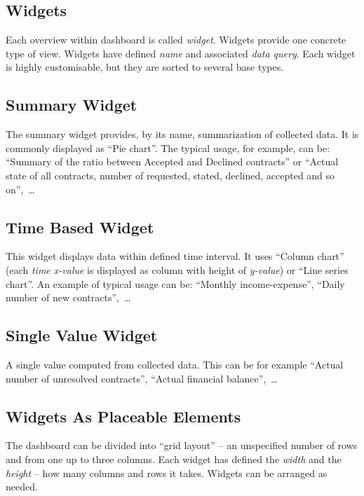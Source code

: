 \subsection{Widgets}
Each overview within dashboard is called \textit{widget}. Widgets provide one concrete type of view. Widgets have defined \textit{name} and associated \textit{data query}. Each widget is highly customisable, but they are sorted to several base types.
\subsection{Summary Widget}
The summary widget provides, by its name, summarization of collected data. It is commonly displayed as ``Pie chart''. The typical usage, for example, can be: ``Summary of the ratio between Accepted and Declined contracts'' or ``Actual state of all contracts, number of requested, stated, declined, accepted and so on'',~\dots
\subsection{Time Based Widget}
This widget displays data within defined time interval. It uses ``Column chart''  (each \textit{time x-value} is displayed as column with height of \textit{y-value}) or ``Line series chart''. An example of typical usage can be: ``Monthly income-expense'', ``Daily number of new contracts'',~\dots
\subsection{Single Value Widget}
A single value computed from collected data. This can be for example ``Actual number of unresolved contracts'', ``Actual financial balance'',~\dots 
\subsection{Widgets As Placeable Elements}
The dashboard can be divided into ``grid layout'' -- an unspecified number of rows and from one up to three columns. Each widget has defined the \textit{width} and the \textit{height} -- how many columns and rows it takes. Widgets can be arranged as needed. 

